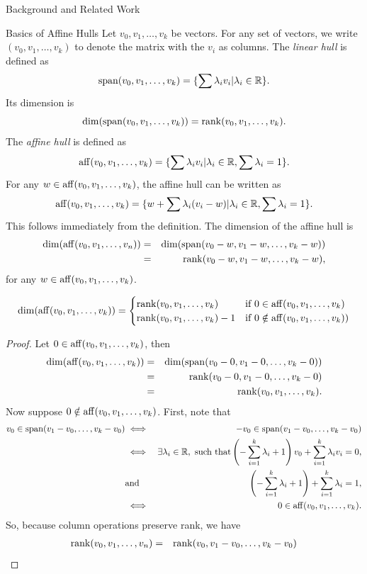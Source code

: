 \documentclass{llncs}
\begin{document}
\begin{section}{Background and Related Work}
\begin{subsection}{Basics of Affine Hulls}
Let $v_0,v_1,\dots, v_k$ be vectors. For any set of vectors, we write $(v_0,v_1,\dots,v_k)$ to denote the matrix with the $v_i$ as columns. The {\em linear hull} is defined as
$$\operatorname{span}(v_0,v_1,\dots,v_k) = \{\sum \lambda_iv_i | \lambda_i \in \mathbb{R}\}.$$
Its dimension is 
$$\dim(\operatorname{span}(v_0,v_1,\dots,v_k)) = \operatorname{rank}(v_0,v_1,\dots, v_k).$$
The {\em affine hull} is defined as 
$$\operatorname{aff}(v_0,v_1,\dots,v_k) = \{\sum\lambda_iv_i | \lambda_i\in \mathbb{R}, \sum\lambda_i = 1\}.$$
For any $w\in \operatorname{aff}(v_0,v_1,\dots,v_k)$, the affine hull can be written as
$$\operatorname{aff}(v_0,v_1,\dots,v_k) = \{w +\sum\lambda_i(v_i-w)|\lambda_i\in \mathbb{R}, \sum\lambda_i=1\}.$$
This follows immediately from the definition. The dimension of the affine hull is 
\begin{eqnarray*}
\dim(\operatorname{aff}(v_0,v_1,\dots,v_n)) &=& \dim(\operatorname{span}(v_0-w,v_1-w,\dots,v_k-w))\\
&=&\operatorname{rank}(v_0-w, v_1-w,\dots,v_k-w),\end{eqnarray*}
for any $w\in \operatorname{aff}(v_0,v_1,\dots,v_k)$.
\begin{lemma}
$$\dim(\operatorname{aff}(v_0,v_1,\dots,v_k)) =
\begin{cases} \operatorname{rank}(v_0,v_1,\dots,v_k) &\text{if }0\in \operatorname{aff}(v_0,v_1,\dots,v_k)\\
\operatorname{rank}(v_0,v_1,\dots,v_k)-1 & \text{if }0\notin \operatorname{aff}(v_0,v_1,\dots,v_k))
\end{cases}$$
\end{lemma}
\begin{proof}
Let $0 \in \operatorname{aff}(v_0,v_1,\dots,v_k)$, then
\begin{eqnarray*}
\dim(\operatorname{aff}(v_0,v_1,\dots,v_k))&=& \dim(\operatorname{span}(v_0-0,v_1-0,\dots,v_k-0))\\
&=&\operatorname{rank}(v_0-0,v_1-0,\dots,v_k-0)\\
&=&\operatorname{rank}(v_0,v_1,\dots,v_k).
\end{eqnarray*}
Now suppose $0 \notin \operatorname{aff} (v_0,v_1,\dots,v_k)$.
First, note that 
\begin{eqnarray*}
v_0 \in \operatorname{span}(v_1-v_0,\dots,v_k-v_0) &\iff & -v_0 \in \operatorname{span}(v_1-v_0, \dots, v_k-v_0) \\
&\iff&\exists \lambda_i \in \mathbb{R} ,\text{   such that} \left(-\sum_{i=1}^k\lambda_i+1\right)v_0 +\sum_{i=1}^k\lambda_iv_i = 0, \\
&\text{and}&\left(-\sum_{i=1}^k\lambda_i+1\right) + \sum_{i=1}^k\lambda_i = 1,\\
&\iff&0\in\operatorname{aff}(v_0,v_1,\dots,v_k).
\end{eqnarray*}
So, because column operations preserve rank, we have
\begin{eqnarray*}
\rank(v_0,v_1,\dots,v_n)&=&\rank(v_0,v_1-v_0,\dots,v_k-v_0)\\

\end{eqnarray*}
\end{proof}
\end{subsection}
\end{section}
\end{document}
